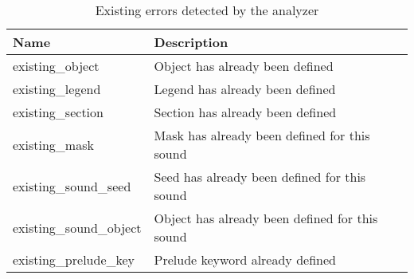 \begin{table}[!htbp]
\centering
\caption{Existing errors detected by the analyzer}
\label{tab:static_errors_existing}
\scriptsize
\begin{tabular}{ll}
\textbf{Name} & \textbf{Description}                                                                    \\ \hline
existing\_object                                    & Object has already been defined                                                \\
existing\_legend                                    & Legend has already been defined                                                \\
existing\_section                                   & Section has already been defined                                               \\
existing\_mask                                      & Mask has already been defined for this sound                                   \\
existing\_sound\_seed                               & Seed has already been defined for this sound                                   \\
existing\_sound\_object                             & Object has already been defined for this sound                                 \\
existing\_prelude\_key                              & Prelude keyword already defined                                                \\
\end{tabular}
\end{table}

